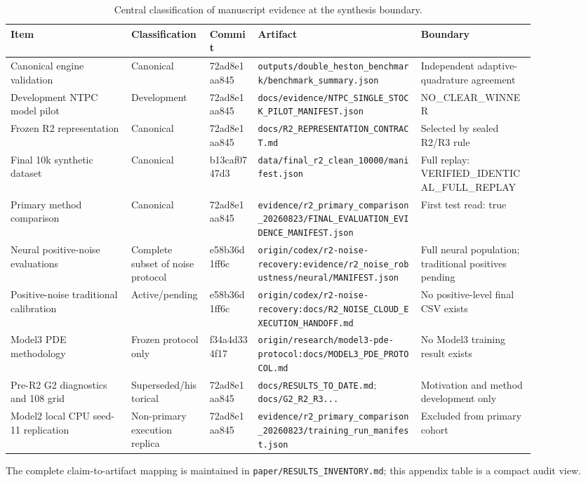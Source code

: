 \begin{table}[htbp]
\centering
\caption{Central classification of manuscript evidence at the synthesis boundary.}
\label{tab:evidence-classification}
\begin{tabular}{p{0.20\linewidth}p{0.13\linewidth}p{0.08\linewidth}p{0.27\linewidth}p{0.19\linewidth}}
\toprule
Item & Classification & Commit & Artifact & Boundary \\
\midrule
Canonical engine validation & Canonical & 72ad8e1aa845 & \texttt{outputs/double\_heston\_benchmark/benchmark\_summary.json} & Independent adaptive-quadrature agreement \\
Development NTPC model pilot & Development & 72ad8e1aa845 & \texttt{docs/evidence/NTPC\_SINGLE\_STOCK\_PILOT\_MANIFEST.json} & NO\_CLEAR\_WINNER \\
Frozen R2 representation & Canonical & 72ad8e1aa845 & \texttt{docs/R2\_REPRESENTATION\_CONTRACT.md} & Selected by sealed R2/R3 rule \\
Final 10k synthetic dataset & Canonical & b13caf0747d3 & \texttt{data/final\_r2\_clean\_10000/manifest.json} & Full replay: VERIFIED\_IDENTICAL\_FULL\_REPLAY \\
Primary method comparison & Canonical & 72ad8e1aa845 & \texttt{evidence/r2\_primary\_comparison\_20260823/FINAL\_EVALUATION\_EVIDENCE\_MANIFEST.json} & First test read: true \\
Neural positive-noise evaluations & Complete subset of noise protocol & e58b36d1ff6c & \texttt{origin/codex/r2-noise-recovery:evidence/r2\_noise\_robustness/neural/MANIFEST.json} & Full neural population; traditional positives pending \\
Positive-noise traditional calibration & Active/pending & e58b36d1ff6c & \texttt{origin/codex/r2-noise-recovery:docs/R2\_NOISE\_CLOUD\_EXECUTION\_HANDOFF.md} & No positive-level final CSV exists \\
Model3 PDE methodology & Frozen protocol only & f34a4d334f17 & \texttt{origin/research/model3-pde-protocol:docs/MODEL3\_PDE\_PROTOCOL.md} & No Model3 training result exists \\
Pre-R2 G2 diagnostics and 108 grid & Superseded/historical & 72ad8e1aa845 & \texttt{docs/RESULTS\_TO\_DATE.md}; \texttt{docs/G2\_R2\_R3...} & Motivation and method development only \\
Model2 local CPU seed-11 replication & Non-primary execution replica & 72ad8e1aa845 & \texttt{evidence/r2\_primary\_comparison\_20260823/training\_run\_manifest.json} & Excluded from primary cohort \\
\bottomrule
\end{tabular}
\par\vspace{0.35em}
\begin{minipage}{0.94\linewidth}\small The complete claim-to-artifact mapping is maintained in \texttt{paper/RESULTS\_INVENTORY.md}; this appendix table is a compact audit view.\end{minipage}
\end{table}
